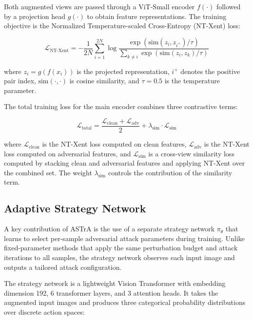\documentclass[conference]{IEEEtran}
\begin{document}
Both augmented views are passed through a ViT-Small encoder $f(\cdot)$ followed by a projection head $g(\cdot)$ to obtain feature representations. The training objective is the Normalized Temperature-scaled Cross-Entropy (NT-Xent) loss:

\begin{equation}
\mathcal{L}_{\text{NT-Xent}} = -\frac{1}{2N} \sum_{i=1}^{2N} \log \frac{\exp(\text{sim}(z_i, z_{i^+}) / \tau)}{\sum_{k \neq i} \exp(\text{sim}(z_i, z_k) / \tau)}
\end{equation}

\noindent where $z_i = g(f(x_i))$ is the projected representation, $i^+$ denotes the positive pair index, $\text{sim}(\cdot, \cdot)$ is cosine similarity, and $\tau = 0.5$ is the temperature parameter.

The total training loss for the main encoder combines three contrastive terms:

\begin{equation}
\mathcal{L}_{\text{total}} = \frac{\mathcal{L}_{\text{clean}} + \mathcal{L}_{\text{adv}}}{2} + \lambda_{\text{sim}} \cdot \mathcal{L}_{\text{sim}}
\end{equation}

\noindent where $\mathcal{L}_{\text{clean}}$ is the NT-Xent loss computed on clean features, $\mathcal{L}_{\text{adv}}$ is the NT-Xent loss computed on adversarial features, and $\mathcal{L}_{\text{sim}}$ is a cross-view similarity loss computed by stacking clean and adversarial features and applying NT-Xent over the combined set. The weight $\lambda_{\text{sim}}$ controls the contribution of the similarity term.

\subsection{Adaptive Strategy Network}

A key contribution of ASTrA is the use of a separate strategy network $\pi_\theta$ that learns to select per-sample adversarial attack parameters during training. Unlike fixed-parameter methods that apply the same perturbation budget and attack iterations to all samples, the strategy network observes each input image and outputs a tailored attack configuration.

The strategy network is a lightweight Vision Transformer with embedding dimension 192, 6 transformer layers, and 3 attention heads. It takes the augmented input images and produces three categorical probability distributions over discrete action spaces:
\end{document}
